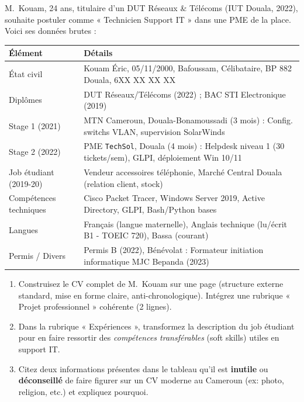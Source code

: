 \documentclass[11pt]{article}
\begin{document}
\begin{exercice}
M.~Kouam, 24 ans, titulaire d'un DUT Réseaux \& Télécoms (IUT Douala, 2022), souhaite postuler comme « Technicien Support IT » dans une PME de la place. Voici ses données brutes :
\begin{center}
\begin{tabular}{|l|l|}
\hline
\textbf{Élément} & \textbf{Détails} \\ \hline
État civil & Kouam Éric, 05/11/2000, Bafoussam, Célibataire, BP 882 Douala, 6XX XX XX XX \\ \hline
Diplômes & DUT Réseaux/Télécoms (2022) ; BAC STI Electronique (2019) \\ \hline
Stage 1 (2021) & MTN Cameroun, Douala-Bonamoussadi (3 mois) : Config. switchs VLAN, supervision SolarWinds \\ \hline
Stage 2 (2022) & PME \texttt{TechSol}, Douala (4 mois) : Helpdesk niveau 1 (30 tickets/sem), GLPI, déploiement Win 10/11 \\ \hline
Job étudiant (2019-20) & Vendeur accessoires téléphonie, Marché Central Douala (relation client, stock) \\ \hline
Compétences techniques & Cisco Packet Tracer, Windows Server 2019, Active Directory, GLPI, Bash/Python bases \\ \hline
Langues & Français (langue maternelle), Anglais technique (lu/écrit B1 - TOEIC 720), Bassa (courant) \\ \hline
Permis / Divers & Permis B (2022), Bénévolat : Formateur initiation informatique MJC Bepanda (2023) \\ \hline
\end{tabular}
\end{center}
\begin{enumerate}
    \item Construisez le CV complet de M.~Kouam sur une page (structure externe standard, mise en forme claire, anti-chronologique). Intégrez une rubrique « Projet professionnel » cohérente (2 lignes).
    \item Dans la rubrique « Expériences », transformez la description du job étudiant pour en faire ressortir des \textit{compétences transférables} (soft skills) utiles en support IT.
    \item Citez deux informations présentes dans le tableau qu'il est \textbf{inutile} ou \textbf{déconseillé} de faire figurer sur un CV moderne au Cameroun (ex: photo, religion, etc.) et expliquez pourquoi.
\end{enumerate}
\end{exercice}
\end{document}
